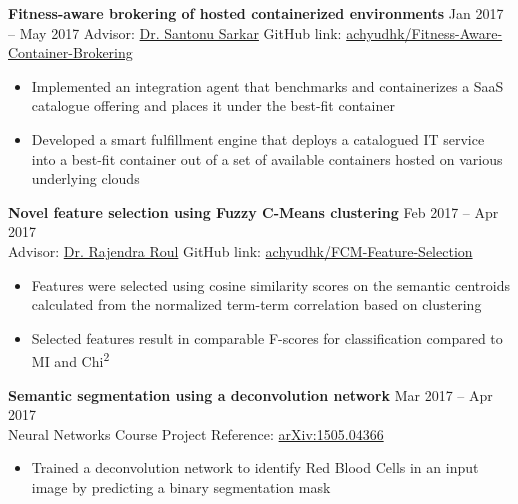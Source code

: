\documentclass[10pt]{article}
\newenvironment{innerlist}[1][\enskip\textbullet]%
        {\begin{itemize}[#1,leftmargin=*,parsep=0pt,itemsep=0pt,topsep=0pt,partopsep=0pt]}
        {\end{itemize}}
\newcommand{\halfblankline}{\quad\vspace{-0.5\baselineskip}\pagebreak[3]}
\begin{document}
\halfblankline

\textbf{Fitness-aware brokering of hosted containerized environments} \hfill {Jan 2017 -- May 2017}
Advisor: \href{https://scholar.google.co.in/citations?user=8UNP6BIAAAAJ}{Dr. Santonu Sarkar} \hfill GitHub link: \href{https://github.com/achyudhk/Fitness-Aware-Container-Brokering}{achyudhk/Fitness-Aware-Container-Brokering}
\vspace{0.5mm}
\begin{innerlist}
\item Implemented an integration agent that benchmarks and containerizes a SaaS catalogue offering and places it under the best-fit container
\item Developed a smart fulfillment engine that deploys a catalogued IT service into a best-fit container out of a set of available containers hosted on various underlying clouds
\end{innerlist}

\halfblankline

\textbf{Novel feature selection using Fuzzy C-Means clustering} \hfill {Feb 2017 -- Apr 2017}\\
Advisor: \href{http://www.bits-pilani.ac.in/goa/rkroul/Profile}{Dr. Rajendra Roul} \hfill GitHub link: \href{https://github.com/achyudhk/FCM-Feature-Selection}{achyudhk/FCM-Feature-Selection}
\vspace{0.5mm}
\begin{innerlist}
\item Features were selected using cosine similarity scores on the semantic centroids calculated from the normalized term-term correlation based on clustering
\item Selected features result in comparable F-scores for classification compared to MI and Chi\textsuperscript{2}
\end{innerlist}

\halfblankline

\textbf{Semantic segmentation using a deconvolution network} \hfill {Mar 2017 -- Apr 2017}\\
Neural Networks Course Project \hfill Reference: \href{https://arxiv.org/abs/1505.04366}{arXiv:1505.04366}
\vspace{0.5mm}
\begin{innerlist}
\item Trained a deconvolution network to identify Red Blood Cells in an input image by predicting a binary segmentation mask
\end{innerlist}
\end{document}
